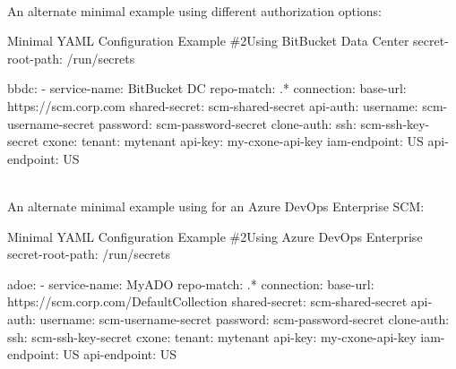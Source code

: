 \pagebreak
\noindent\\An alternate minimal example using different authorization options:

\begin{code}{Minimal YAML Configuration Example \#2}{Using BitBucket Data Center}{}
secret-root-path: /run/secrets

bbdc:
    - service-name: BitBucket DC
      repo-match: .*
      connection:
      base-url: https://scm.corp.com
      shared-secret: scm-shared-secret
      api-auth:
          username: scm-username-secret
          password: scm-password-secret
      clone-auth:
          ssh: scm-ssh-key-secret
      cxone:
        tenant: mytenant
        api-key: my-cxone-api-key
        iam-endpoint: US
        api-endpoint: US
\end{code}
    
\pagebreak
\noindent\\An alternate minimal example using for an Azure DevOps Enterprise
SCM:

\begin{code}{Minimal YAML Configuration Example \#2}{Using Azure DevOps Enterprise}{}
secret-root-path: /run/secrets

adoe:
    - service-name: MyADO
      repo-match: .*
      connection:
      base-url: https://scm.corp.com/DefaultCollection
      shared-secret: scm-shared-secret
      api-auth:
          username: scm-username-secret
          password: scm-password-secret
      clone-auth:
          ssh: scm-ssh-key-secret
      cxone:
        tenant: mytenant
        api-key: my-cxone-api-key
        iam-endpoint: US
        api-endpoint: US
\end{code}
